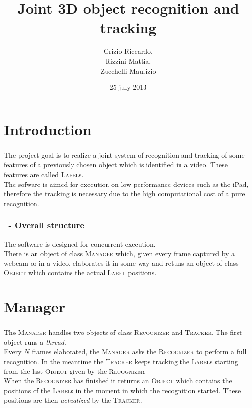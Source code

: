 \documentclass{beamer}
\title{Joint 3D object recognition and tracking}
\author[Orizio, Rizzini, Zucchelli]{Orizio Riccardo,\\Rizzini Mattia,\\Zucchelli Maurizio}
\date{25 july 2013}
\institute[UniBS]{University of Brescia}
\begin{document}
  \begin{frame}
    \maketitle
  \end{frame}

  \section{Introduction}
  
  \begin{frame}
    \frametitle{\insertsection}
    The project goal is to realize a joint system of recognition and tracking
    of some features of a previously chosen object which is identified in a
    video.  These features are called \textsc{Label}s.\\
    The sofware is aimed for execution on low performance devices such as the
    iPad, therefore the tracking is necessary due to the high computational
    cost of a pure recognition.\\
  \end{frame}

  \begin{frame}
    \frametitle{\insertsection\ - Overall structure}
    The software is designed for concurrent execution.\\
    There is an object of class \textsc{Manager} which, given every frame
    captured by a webcam or in a video, elaborates it in some way and retuns
    an object of class \textsc{Object} which contains the actual \textsc{Label}
    positions.\\
  \end{frame}

  \section{Manager}

  \begin{frame}
    \frametitle{\insertsection}
    The \textsc{Manager} handles two objects of class \textsc{Recognizer} and
    \textsc{Tracker}. The first object runs a \emph{thread}.\\
    Every $N$ frames elaborated, the \textsc{Manager} asks the
    \textsc{Recognizer} to perform a full recognition. In the meantime the
    \textsc{Tracker} keeps tracking the \textsc{Label}s starting from the last
    \textsc{Object} given by the \textsc{Recognizer}.\\
    When the \textsc{Recognizer} has finished it returns an \textsc{Object}
    which contains the positions of the \textsc{Label}s in the moment in which
    the recognition started. These positions are then \emph{actualized} by the
    \textsc{Tracker}.\\
  \end{frame}
\end{document}
